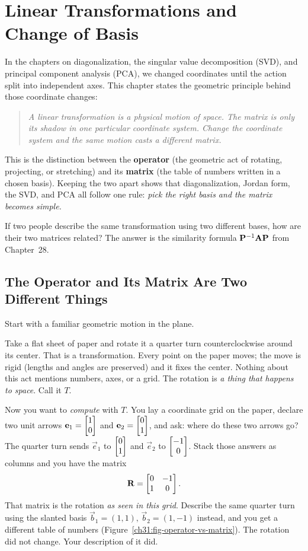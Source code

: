 \chapter{Linear Transformations and Change of Basis}

In the chapters on diagonalization, the singular value decomposition (SVD), and principal component analysis (PCA), we changed coordinates until the action split into independent axes. This chapter states the geometric principle behind those coordinate changes:

\begin{quote}
\emph{A linear transformation is a physical motion of space. The matrix is only
its shadow in one particular coordinate system. Change the coordinate system and
the same motion casts a different matrix.}
\end{quote}

This is the distinction between the \textbf{operator} (the geometric act of rotating, projecting, or stretching) and its \textbf{matrix} (the table of numbers written in a chosen basis). Keeping the two apart shows that diagonalization, Jordan form, the SVD, and PCA all follow one rule: \emph{pick the right basis and the matrix becomes simple.}

If two people describe the same transformation using two different bases, how are their two matrices related? The answer is the similarity formula $\mathbf{P}^{-1}\mathbf{A}\mathbf{P}$ from Chapter~28.

\section{The Operator and Its Matrix Are Two Different Things}
\label{ch31:operator-vs-matrix}

Start with a familiar geometric motion in the plane.

Take a flat sheet of paper and rotate it a quarter turn counterclockwise around
its center. That is a transformation. Every point on the paper moves; the move is
rigid (lengths and angles are preserved) and it fixes the center. Nothing about
this act mentions numbers, axes, or a grid. The rotation is \emph{a thing
that happens to space}. Call it $T$.

Now you want to \emph{compute} with $T$. You lay a coordinate grid on the paper,
declare two unit arrows $\mathbf{e}_1 = \begin{bmatrix}1\\0\end{bmatrix}$ and $\mathbf{e}_2 = \begin{bmatrix}0\\1\end{bmatrix}$,
and ask: where do these two arrows go? The quarter turn sends $\vec{e}_1$ to
$\begin{bmatrix}0\\1\end{bmatrix}$ and $\vec{e}_2$ to $\begin{bmatrix}-1\\0\end{bmatrix}$. Stack those answers as
columns and you have the matrix
\[
  \mathbf{R} = \begin{bmatrix} 0 & -1 \\ 1 & 0 \end{bmatrix}.
\]
That matrix is the rotation \emph{as seen in this grid}. Describe the same quarter turn using the slanted basis $\vec{b}_1=(1,1),\,\vec{b}_2=(1,-1)$ instead, and you get a different table of numbers (Figure~\ref{ch31:fig-operator-vs-matrix}).
The rotation did not change. Your description of it did.

